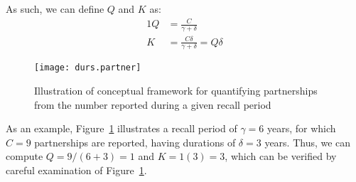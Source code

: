 As such, we can define $Q$ and $K$ as:
\begin{alignat}{1}
  Q &= \frac{C}{\gamma+\delta} \label{eq:C2Q.app}\\
  K &= \frac{C\delta}{\gamma+\delta} = Q\delta \label{eq:C2K.app}
\end{alignat}
\begin{figure}
  \centering
  \texttt{[image: durs.partner]}
  \caption{Illustration of conceptual framework for quantifying partnerships
    from the number reported during a given recall period}
  \label{fig:durs.partner}
\end{figure}
\par
As an example, Figure~\ref{fig:durs.partner} illustrates
a recall period of $\gamma = 6$ years,
for which $C = 9$ partnerships are reported,
having durations of $\delta = 3$ years.
Thus, we can compute $Q = 9/(6+3) = 1$ and $K = 1(3) = 3$,
which can be verified by careful examination of Figure~\ref{fig:durs.partner}.
